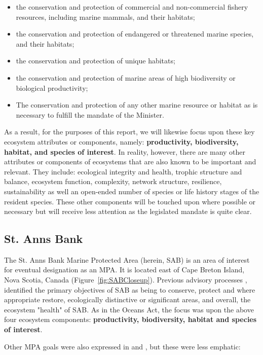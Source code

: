 \documentclass[letterpaper,portrait,11pt]{scrartcl}
\numberwithin{equation}{section}		%
\numberwithin{figure}{section}		%
\numberwithin{table}{section}				%
\begin{document}
\begin{itemize}
  \item the conservation and protection of commercial and non-commercial fishery resources, including marine mammals, and their habitats; 
  \item the conservation and protection of endangered or threatened marine species, and their habitats; 
  \item the conservation and protection of unique habitats; 
  \item the conservation and protection of marine areas of high biodiversity or biological productivity; 
  \item The conservation and protection of any other marine resource or habitat as is necessary to fulfill the mandate of the Minister.
\end{itemize}

As a result, for the purposes of this report, we will likewise focus upon these key ecosystem attributes or components, namely: \textbf{productivity, biodiversity, habitat, and  species of interest}. In reality, however, there are many other attributes or components of ecosystems that are also known to be important and relevant. They include: ecological integrity and health, trophic structure and balance, ecosystem function, complexity, network structure, resilience, sustainability as well an open-ended number of species or life history stages of the resident species. These other components will be touched upon where possible or necessary but will receive less attention as the legislated mandate is quite clear. 

\subsection{St. Anns Bank}
The St. Anns Bank Marine Protected Area (herein, SAB) is an area of interest for eventual designation as an MPA. It is located east of Cape Breton Island, Nova Scotia, Canada (Figure~\ref{fig:SABCloseup}). Previous advisory processes \parencites{DFO:2012:conservation, Kenchington:2013:sab}, identified the primary objectives of SAB as being to conserve, protect and where appropriate restore, ecologically distinctive or significant areas, and overall, the ecosystem "health" of SAB. As in the Oceans Act, the focus was upon the above four ecosystem components: \textbf{productivity, biodiversity, habitat and species of interest}.

Other MPA goals were also expressed in \textcite{DFO:2012:conservation} and \textcite{Kenchington:2013:sab}, but these were less emphatic:
\end{document}
